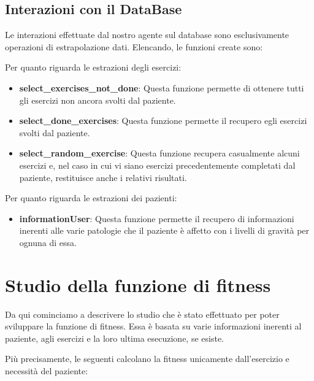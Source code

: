 \documentclass{article}
\begin{document}
\pagebreak

    \subsection{Interazioni con il DataBase}
    Le interazioni effettuate dal nostro agente sul database sono esclusivamente operazioni di estrapolazione dati. Elencando, le funzioni create sono:


    Per quanto riguarda le estrazioni degli esercizi:
    \begin{itemize}
        \item\textbf{select\_exercises\_not\_done}: Questa funzione permette di ottenere tutti gli esercizi non ancora svolti dal paziente.

        \item\textbf{select\_done\_exercises}: Questa funzione permette il recupero egli esercizi svolti dal paziente.

        \item\textbf{select\_random\_exercise}: Questa funzione recupera casualmente alcuni esercizi e, nel caso in cui vi siano esercizi precedentemente completati dal paziente, restituisce anche i relativi risultati.

    \end{itemize}
    Per quanto riguarda le estrazioni dei pazienti:
    \begin{itemize}
        \item\textbf{informationUser}: Questa funzione permette il recupero di informazioni inerenti alle varie patologie che il paziente è affetto con i livelli di gravità per ognuna di essa.

    \end{itemize}

\pagebreak

    \section{Studio della funzione di fitness}
    Da qui cominciamo a descrivere lo studio che è stato effettuato per poter sviluppare la funzione di fitness. Essa è basata su varie informazioni inerenti al paziente, agli esercizi e la loro ultima esecuzione, se esiste.

    Più precisamente, le seguenti calcolano la fitness unicamente dall'esercizio e necessità del paziente:
\end{document}
